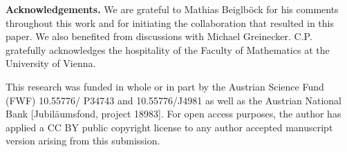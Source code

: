 \documentclass[a4paper, 10pt]{article}
\numberwithin{theorem}{section}
\theoremstyle{definition}
\begin{document}
\vspace{1em}

\noindent
{\bf Acknowledgements.}
We are grateful to Mathias Beiglböck for his comments throughout this work and for initiating the collaboration that resulted in this paper. We also benefited from discussions with Michael Greinecker. C.P. gratefully acknowledges the hospitality of the Faculty of Mathematics at the University of Vienna.

This research was funded in whole or in part by the Austrian Science
Fund (FWF)  10.55776/ P34743 and 10.55776/J4981 as well as the Austrian National Bank
[Jubiläumsfond, project 18983]. For open access purposes, the author has
applied a CC BY public copyright license to any author accepted
manuscript version arising from this submission.


 


\end{document}
